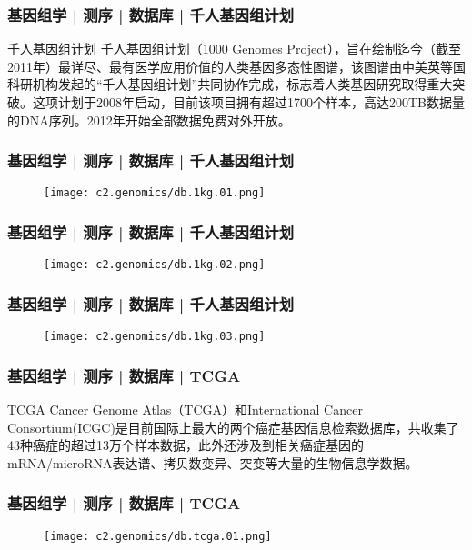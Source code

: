 \begin{frame}
  \frametitle{基因组学 | 测序 | 数据库 | 千人基因组计划}
  \begin{block}{千人基因组计划}
千人基因组计划（1000 Genomes Project），旨在绘制迄今（截至2011年）最详尽、最有医学应用价值的人类基因多态性图谱，该图谱由中美英等国科研机构发起的“千人基因组计划”共同协作完成，标志着人类基因研究取得重大突破。这项计划于2008年启动，目前该项目拥有超过1700个样本，高达200TB数据量的DNA序列。2012年开始全部数据免费对外开放。
  \end{block}
\end{frame}
    
\begin{frame}
  \frametitle{基因组学 | 测序 | 数据库 | 千人基因组计划}
  \begin{figure}
    \centering
    \texttt{[image: c2.genomics/db.1kg.01.png]}
  \end{figure}
\end{frame}
    
\begin{frame}
  \frametitle{基因组学 | 测序 | 数据库 | 千人基因组计划}
  \begin{figure}
    \centering
    \texttt{[image: c2.genomics/db.1kg.02.png]}
  \end{figure}
\end{frame}
    
\begin{frame}
  \frametitle{基因组学 | 测序 | 数据库 | 千人基因组计划}
  \begin{figure}
    \centering
    \texttt{[image: c2.genomics/db.1kg.03.png]}
  \end{figure}
\end{frame}
    
\begin{frame}
  \frametitle{基因组学 | 测序 | 数据库 | TCGA}
  \begin{block}{TCGA}
Cancer Genome Atlas（TCGA）和International Cancer Consortium(ICGC)是目前国际上最大的两个癌症基因信息检索数据库，共收集了43种癌症的超过13万个样本数据，此外还涉及到相关癌症基因的mRNA/microRNA表达谱、拷贝数变异、突变等大量的生物信息学数据。
  \end{block}
\end{frame}

\begin{frame}
  \frametitle{基因组学 | 测序 | 数据库 | TCGA}
  \begin{figure}
    \centering
    \texttt{[image: c2.genomics/db.tcga.01.png]}
  \end{figure}
\end{frame}
    
